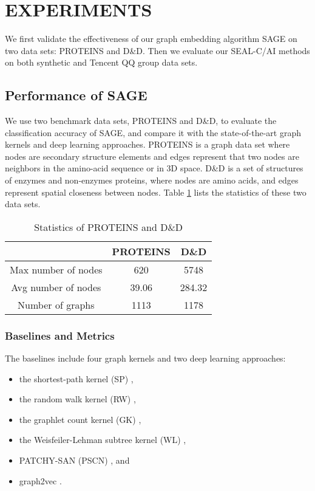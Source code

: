 \documentclass[sigconf]{acmart}
\begin{document}
\section{EXPERIMENTS}\label{sec.exp}
We first validate the effectiveness of our graph embedding algorithm SAGE on two data sets: PROTEINS and D\&D.  Then we evaluate our SEAL-C/AI methods on both synthetic and Tencent QQ group data sets.

\subsection{Performance of SAGE}
We use two benchmark data sets, PROTEINS and D\&D, to evaluate the classification accuracy of SAGE, and compare it with the state-of-the-art graph kernels and deep learning approaches.  PROTEINS \cite{borgwardt2005protein} is a graph data set where nodes are secondary structure elements and edges represent that two nodes are neighbors in the amino-acid sequence or in 3D space.  D\&D \cite{dobson2003distinguishing} is a set of structures of enzymes and non-enzymes proteins, where nodes are amino acids, and edges represent spatial closeness between nodes.  Table \ref{tab:twodatasets} lists the statistics of these two data sets.

\begin{table}
  \caption{Statistics of PROTEINS and D\&D}
  \label{tab:twodatasets}
  \begin{tabular}{ccc}
    \toprule
&\textbf{PROTEINS}& \textbf{D\&D}\\
    \midrule
	Max number of nodes &620&5748\\
	Avg number of nodes &39.06&284.32\\
	Number of graphs &1113&1178\\
  \bottomrule
\end{tabular}
\end{table}


\subsubsection{Baselines and Metrics}\label{bench.base}

The baselines include four graph kernels and two deep learning approaches:

\begin{itemize}
\item the shortest-path kernel (SP) \cite{borgwardt2005shortest},

\item the random walk kernel (RW) \cite{gartner2003graph},

\item the graphlet count kernel (GK) \cite{shervashidze2009efficient},

\item the Weisfeiler-Lehman subtree kernel (WL) \cite{shervashidze2011weisfeiler},

\item PATCHY-SAN (PSCN) \cite{Niepert2016LearningCN}, and

\item graph2vec \cite{DBLP:journals/corr/NarayananCVCLJ17}.

\end{itemize}
\end{document}
